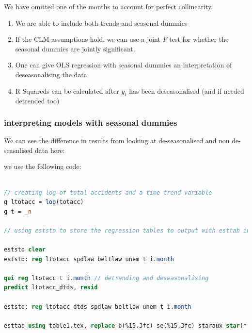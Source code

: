 \documentclass[11pt]{article}
\begin{document}
We have omitted one of the months to account for perfect collinearity.

\begin{note}
    \begin{enumerate}
        \item We are able to include both trends and seasonal dummies

        \item If the CLM assumptions hold, we can use a joint $F$ test for whether the seasonal dummies are jointly significant.

        \item One can give OLS regression with seasonal dummies an interpretation of deseasonalising the data

        \item R-Squareds can be calculated after $y_t$ has been deseasonalised (and if needed detrended too)
    \end{enumerate}
\end{note}

\subsubsection{interpreting models with seasonal dummies}

We can see the difference in results from looking at de-seasonalised and non de-seasnlised data here:

we use the following code:

\begin{lstlisting}[language = Stata, numbers = none, caption = De-trending and de-seasonalising data]

// creating log of total accidents and a time trend variable
g ltotacc = log(totacc)
g t = _n

// using eststo to store the regression tables to output with esttab in LaTeX.

eststo clear
eststo: reg ltotacc spdlaw beltlaw unem t i.month

qui reg ltotacc t i.month // detrending and deseasonalising
predict ltotacc_dtds, resid

eststo: reg ltotacc_dtds spdlaw beltlaw unem t i.month

esttab using table1.tex, replace b(%15.3fc) se(%15.3fc) staraux star(* 0.10 ** 0.05 *** 0.01) r2 booktabs  label

\end{lstlisting}
\end{document}
